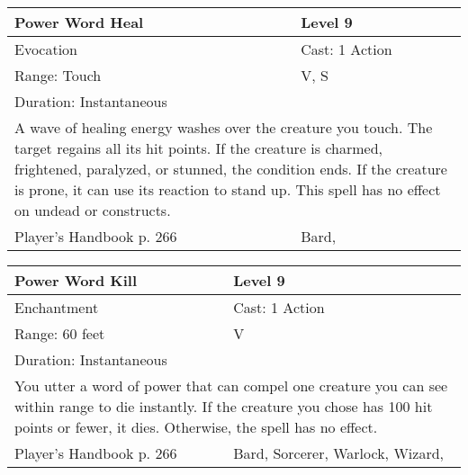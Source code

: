 \documentclass[11pt]{report}
\begin{document}
\begin{table}[H]
	\begin{tabular}{||p{6cm}|p{6cm}||}
		\hline\hline
		\bf{Power Word Heal} & Level 9\\ \hline
		Evocation & Cast: 1 Action\\ \hline
		Range: Touch & V, S\\ \hline
		Duration: Instantaneous & \\ \hline
		\multicolumn{2}{||p{12cm}||}{A wave of healing energy washes over the creature you touch. The target regains all its hit points. If the creature is charmed, frightened, paralyzed, or stunned, the condition ends. If the creature is prone, it can use its reaction to stand up. This spell has no effect on undead or constructs.}\\ \hline
Player's Handbook p. 266 & Bard, \\ \hline\hline
	\end{tabular}
\end{table}

\begin{table}[H]
	\begin{tabular}{||p{6cm}|p{6cm}||}
		\hline\hline
		\bf{Power Word Kill} & Level 9\\ \hline
		Enchantment & Cast: 1 Action\\ \hline
		Range: 60 feet & V\\ \hline
		Duration: Instantaneous & \\ \hline
		\multicolumn{2}{||p{12cm}||}{You utter a word of power that can compel one creature you can see within range to die instantly. If the creature you chose has 100 hit points or fewer, it dies. Otherwise, the spell has no effect.}\\ \hline
Player's Handbook p. 266 & Bard, Sorcerer, Warlock, Wizard, \\ \hline\hline
	\end{tabular}
\end{table}
\end{document}

